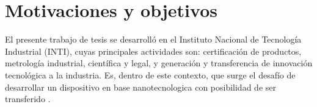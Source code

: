 







\section{Motivaciones y objetivos}

	El presente trabajo de tesis se desarrolló en el Instituto Nacional de Tecnología Industrial (INTI), cuyas principales actividades son: certificación de productos, metrología industrial, científica y legal, y generación y transferencia	de innovación tecnológica a la industria. Es, dentro de este contexto, que surge el desafío de desarrollar un dispositivo en base nanotecnologica con posibilidad de ser transferido . 

